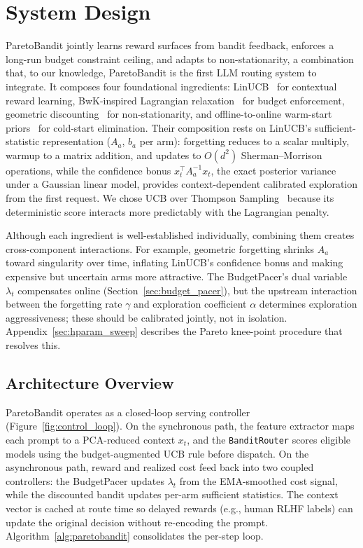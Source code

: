 \section{System Design}
\label{sec:system_design}

ParetoBandit jointly learns reward surfaces from bandit feedback, enforces a long-run budget constraint ceiling, and adapts to non-stationarity, a combination that, to our knowledge, ParetoBandit is the first LLM routing system to integrate. It composes four foundational ingredients: LinUCB~\cite{li2010contextual} for contextual reward learning, BwK-inspired Lagrangian relaxation~\cite{badanidiyuru2013bwk, agrawal2016linear} for budget enforcement, geometric discounting~\cite{garivier2011switching, russac2019weighted} for non-stationarity, and offline-to-online warm-start priors~\cite{oetomo2023warmstart} for cold-start elimination. Their composition rests on LinUCB's sufficient-statistic representation ($A_a$, $b_a$ per arm): forgetting reduces to a scalar multiply, warmup to a matrix addition, and updates to $O(d^2)$ Sherman--Morrison operations, while the confidence bonus $x_t^\top A_a^{-1} x_t$, the exact posterior variance under a Gaussian linear model, provides context-dependent calibrated exploration from the first request. We chose UCB over Thompson Sampling~\cite{agrawal2013thompson} because its deterministic score interacts more predictably with the Lagrangian penalty.

Although each ingredient is well-established individually, combining them creates cross-component interactions. For example, geometric forgetting shrinks $A_a$ toward singularity over time, inflating LinUCB's confidence bonus and making expensive but uncertain arms more attractive. The BudgetPacer's dual variable $\lambda_t$ compensates online (Section~\ref{sec:budget_pacer}), but the upstream interaction between the forgetting rate $\gamma$ and exploration coefficient $\alpha$ determines exploration aggressiveness; these should be calibrated jointly, not in isolation. Appendix~\ref{sec:hparam_sweep} describes the Pareto knee-point procedure that resolves this.

\subsection{Architecture Overview}
\label{sec:architecture}

ParetoBandit operates as a closed-loop serving controller (Figure~\ref{fig:control_loop}). On the synchronous path, the feature extractor maps each prompt to a PCA-reduced context $x_t$, and the \texttt{BanditRouter} scores eligible models using the budget-augmented UCB rule before dispatch. On the asynchronous path, reward and realized cost feed back into two coupled controllers: the BudgetPacer updates $\lambda_t$ from the EMA-smoothed cost signal, while the discounted bandit updates per-arm sufficient statistics. The context vector is cached at route time so delayed rewards (e.g., human RLHF labels) can update the original decision without re-encoding the prompt. Algorithm~\ref{alg:paretobandit} consolidates the per-step loop.

